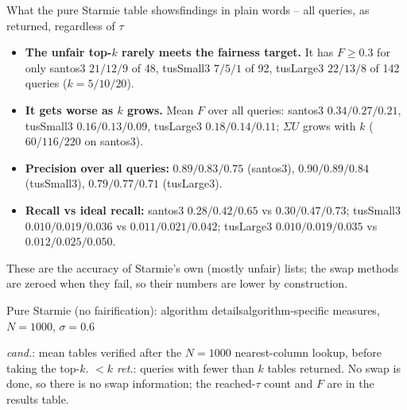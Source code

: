 \documentclass[aspectratio=169,10pt]{beamer}
\newcommand{\highlight}[1]{{\color{Cat1}\bfseries #1}}
\begin{document}
\begin{frame}{What the pure Starmie table shows}{findings in plain words -- all queries, as returned, regardless of $\tau$}
\small
\begin{itemize}\setlength\itemsep{4pt}
\item \highlight{The unfair top-$k$ rarely meets the fairness target.} It has $F\ge0.3$ for only santos3 $21/12/9$ of 48, tusSmall3 $7/5/1$ of 92, tusLarge3 $22/13/8$ of 142 queries ($k{=}5/10/20$).
\item \highlight{It gets worse as $k$ grows.} Mean $F$ over all queries: santos3 $0.34/0.27/0.21$, tusSmall3 $0.16/0.13/0.09$, tusLarge3 $0.18/0.14/0.11$; $\Sigma U$ grows with $k$ ($60/116/220$ on santos3).
\item \highlight{Precision over all queries:} $0.89/0.83/0.75$ (santos3), $0.90/0.89/0.84$ (tusSmall3), $0.79/0.77/0.71$ (tusLarge3).
\item \highlight{Recall vs ideal recall:} santos3 $0.28/0.42/0.65$ vs $0.30/0.47/0.73$; tusSmall3 $0.010/0.019/0.036$ vs $0.011/0.021/0.042$; tusLarge3 $0.010/0.019/0.035$ vs $0.012/0.025/0.050$.
\end{itemize}
\vspace{2pt}
{\footnotesize\color{Muted} These are the accuracy of Starmie's own (mostly unfair) lists; the swap methods are zeroed when they fail, so their numbers are lower by construction.}
\end{frame}

\begin{frame}{Pure Starmie (no fairification): algorithm details}{algorithm-specific measures, $N{=}1000$, $\sigma{=}0.6$}
\scriptsize
\begin{center}
\setlength{\tabcolsep}{2.5pt}
\end{center}
\vspace{2pt}
{\footnotesize\color{Muted} \emph{cand.}: mean tables verified after the $N{=}1000$ nearest-column lookup, before taking the top-$k$. \emph{$<k$ ret.}: queries with fewer than $k$ tables returned. No swap is done, so there is no swap information; the reached-$\tau$ count and $F$ are in the results table.}
\end{frame}
\end{document}
